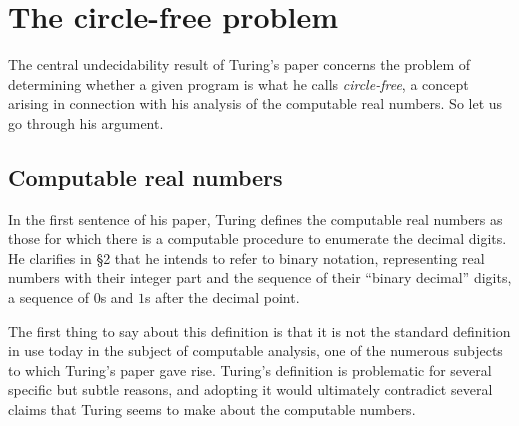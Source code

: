 \documentclass{amsart}
\begin{document}
\section{The circle-free problem}

The central undecidability result of Turing's paper concerns the problem of determining whether a given program is what he calls \emph{circle-free}, a concept arising in connection with his analysis of the computable real numbers. So let us go through his argument.

\subsection{Computable real numbers}

In the first sentence of his paper, Turing defines the computable real numbers as those for which there is a computable procedure to enumerate the decimal digits. He clarifies in \S2 that he intends to refer to binary notation, representing real numbers with their integer part and the sequence of their ``binary decimal'' digits, a sequence of $0$s and $1$s after the decimal point.

The first thing to say about this definition is that it is not the standard definition in use today in the subject of computable analysis, one of the numerous subjects to which Turing's paper gave rise. Turing's definition is problematic for several specific but subtle reasons, and adopting it would ultimately contradict several claims that Turing seems to make about the computable numbers.  
\end{document}
